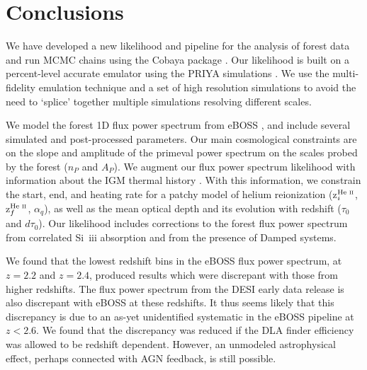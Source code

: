 \section{Conclusions}\label{sec:conclusions}

We have developed a new likelihood and pipeline for the analysis of \Lya forest data and run MCMC chains using the Cobaya package \cite{2021JCAP...05..057T, 2019ascl.soft10019T}.
Our likelihood is built on a percent-level accurate emulator using the PRIYA simulations \cite{2023simsuite}.
We use the multi-fidelity emulation technique \cite{2022MNRAS.517.3200F} and a set of high resolution simulations to avoid the need to `splice' together multiple simulations resolving different scales.

We model the \Lya forest 1D flux power spectrum from eBOSS \cite{2019JCAP...07..017C}, and include several simulated and post-processed parameters.
Our main cosmological constraints are on the slope and amplitude of the primeval power spectrum on the scales probed by the \Lya forest ($n_P$ and $A_P$). 
We augment our \Lya flux power spectrum likelihood with information about the IGM thermal history \cite{2021MNRAS.506.4389G}.
With this information, we constrain the start, end, and heating rate for a patchy model of helium reionization (z$^{\text{He~{\sc ii}}}_i$, z$^{\text{He~{\sc ii}}}_f$, $\alpha_q$), as well as the mean optical depth and its evolution with redshift ($\tau_0$ and $d\tau_0$).
Our likelihood includes corrections to the \lya forest flux power spectrum from correlated Si~{\sc iii} absorption and from the presence of Damped \lya systems.

We found that the lowest redshift bins in the eBOSS flux power spectrum, at $z=2.2$ and $z=2.4$, produced results which were discrepant with those from higher redshifts.
The flux power spectrum from the DESI early data release is also discrepant with eBOSS at these redshifts.
It thus seems likely that this discrepancy is due to an as-yet unidentified systematic in the eBOSS pipeline at $z < 2.6$. We found that the discrepancy was reduced if the DLA finder efficiency was allowed to be redshift dependent. However, an unmodeled astrophysical effect, perhaps connected with AGN feedback, is still possible.  

